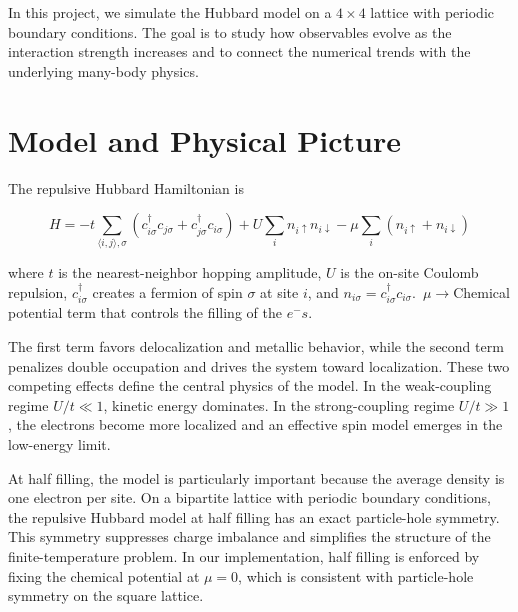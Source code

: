 \documentclass[9pt,a4paper,twocolumn,twoside]{rho-class/rho}
\begin{document}
In this project, we simulate the Hubbard model on a $4\times4$ lattice with periodic boundary conditions. The goal is to study how observables evolve as the interaction strength increases and to connect the numerical trends with the underlying many-body physics.

\section{Model and Physical Picture}

The repulsive Hubbard Hamiltonian is

\begin{equation}
H = -t \sum_{\langle i,j\rangle,\sigma}
\left(c^\dagger_{i\sigma}c_{j\sigma} + c^\dagger_{j\sigma}c_{i\sigma}\right)
+ U \sum_i n_{i\uparrow}n_{i\downarrow}-\mu\sum_i(n_{i\uparrow}+n_{i\downarrow})
\end{equation}

where $t$ is the nearest-neighbor hopping amplitude, $U$ is the on-site Coulomb repulsion, $c^\dagger_{i\sigma}$ creates a fermion of spin $\sigma$ at site $i$, and $n_{i\sigma}=c^\dagger_{i\sigma}c_{i\sigma}$.\, $\mu \rightarrow$Chemical potential term that controls the filling of the $e^-s$.


The first term favors delocalization and metallic behavior, while the second term penalizes double occupation and drives the system toward localization. These two competing effects define the central physics of the model. In the weak-coupling regime $U/t \ll 1$, kinetic energy dominates. In the strong-coupling regime $U/t \gg 1$, the electrons become more localized and an effective spin model emerges in the low-energy limit.

At half filling, the model is particularly important because the average density is one electron per site. On a bipartite lattice with periodic boundary conditions, the repulsive Hubbard model at half filling has an exact particle-hole symmetry. This symmetry suppresses charge imbalance and simplifies the structure of the finite-temperature problem. In our implementation, half filling is enforced by fixing the chemical potential at $\mu = 0$, which is consistent with particle-hole symmetry on the square lattice.
\end{document}
